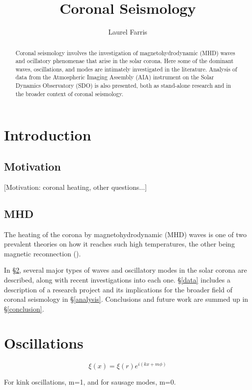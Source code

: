 \documentclass[preprint2]{aastex}
\newcommand{\mhd}{magnetohydrodynamic}
\begin{document}
\title{\vspace{-0.75in}Coronal Seismology}
\author{\vspace{-0.25in}Laurel Farris}

\begin{abstract}
    Coronal seismology involves the investigation of {\mhd} (MHD) waves and
ocillatory phenomenae that arise in the solar corona. Here some of the
dominant waves, oscillations, and modes are intimately investigated in
the literature. Analysis of data from the Atmospheric Imaging
Assembly (AIA) instrument on the Solar Dynamics Observatory (SDO) is
also presented, both as stand-alone research and in the broader
context of coronal seismology.
\end{abstract}

\section{Introduction}\label{intro}
\subsection{Motivation}
[Motivation: coronal heating, other questions$\ldots$]

\subsection{MHD}
The heating of the corona by {\mhd} (MHD) waves is one of two prevalent theories
on how it reaches such high temperatures, the other being magnetic
reconnection (\cite{acoustic_1}).

In \S\ref{MHD}, several major types of waves and oscillatory modes in
the solar corona are described, along with recent investigations into
each one. \S\ref{data} includes a description of a research project and
its implications for the broader field of coronal seismology in
\S\ref{analysis}. Conclusions and future work are summed up in
\S\ref{conclusion}.


\section{Oscillations}\label{MHD}

$$ \xi(x) = \xi(r)e^{i(kx+m\phi)} $$

For kink oscillations, m=1, and for sausage
modes, m=0.
\end{document}
